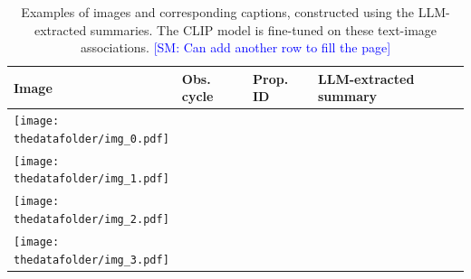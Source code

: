 \documentclass[10pt]{article} %
\newcommand{\SM}[1]{\textcolor{blue}{[SM: #1]}}
\begin{document}
\begin{table}[h!]
      \centering
      \begin{tabular}{m{} p{1.9cm} p{1.9cm} m{8cm}}
          \toprule
          \centering \bfseries Image & \centering \bfseries Obs. cycle & \centering \bfseries Prop. ID & \centering \bfseries LLM-extracted summary \tabularnewline
          \midrule
          \centering \texttt{[image: \\thedatafolder/img\_0.pdf]} & \centering  & \centering  &  {\scriptsize } \tabularnewline
          \midrule
          \centering \texttt{[image: \\thedatafolder/img\_1.pdf]} & \centering  & \centering  &  {\scriptsize } \tabularnewline
          \midrule
          \centering \texttt{[image: \\thedatafolder/img\_2.pdf]} & \centering  & \centering  &  {\scriptsize } \tabularnewline
          \midrule
          \centering \texttt{[image: \\thedatafolder/img\_3.pdf]} & \centering  & \centering  &  {\scriptsize } \tabularnewline
          \bottomrule
      \end{tabular}
      \caption{Examples of images and corresponding captions, constructed using the LLM-extracted summaries. The CLIP model is fine-tuned on these text-image associations. \SM{Can add another row to fill the page}}
      \label{tab:dataset}
  \end{table}
\end{document}
